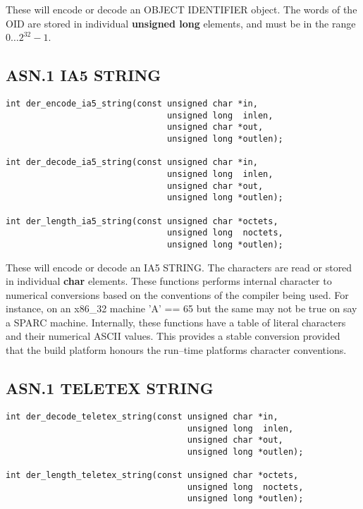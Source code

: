 \documentclass[synpaper]{book}
\begin{document}
These will encode or decode an OBJECT IDENTIFIER object.  The words of the OID are stored in individual \textbf{unsigned long} elements, and must be in the range
$0 \ldots 2^{32} - 1$.

\subsection{ASN.1 IA5 STRING}

\begin{verbatim}
int der_encode_ia5_string(const unsigned char *in,
                                unsigned long  inlen,
                                unsigned char *out,
                                unsigned long *outlen);

int der_decode_ia5_string(const unsigned char *in,
                                unsigned long  inlen,
                                unsigned char *out,
                                unsigned long *outlen);

int der_length_ia5_string(const unsigned char *octets,
                                unsigned long  noctets,
                                unsigned long *outlen);
\end{verbatim}

These will encode or decode an IA5 STRING.  The characters are read or stored in individual \textbf{char} elements.  These functions performs internal character
to numerical conversions based on the conventions of the compiler being used.  For instance, on an x86\_32 machine 'A' == 65 but the same may not be true on
say a SPARC machine.  Internally, these functions have a table of literal characters and their numerical ASCII values.  This provides a stable conversion provided
that the build platform honours the run--time platforms character conventions.

\subsection{ASN.1 TELETEX STRING}

\begin{verbatim}
int der_decode_teletex_string(const unsigned char *in,
                                    unsigned long  inlen,
                                    unsigned char *out,
                                    unsigned long *outlen);

int der_length_teletex_string(const unsigned char *octets,
                                    unsigned long  noctets,
                                    unsigned long *outlen);
\end{verbatim}
\end{document}
